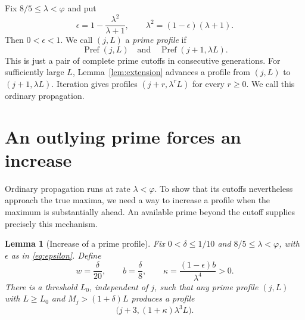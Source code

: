 \documentclass[11pt,letterpaper]{article}
\numberwithin{equation}{section}
\newtheorem{lemma}[theorem]{Lemma}
\theoremstyle{definition}
\theoremstyle{remark}
\DeclareMathOperator{\Pref}{Pref}
\newcommand{\ph}{\varphi}
\begin{document}
Fix $8/5\le\lambda<\ph$ and put
\begin{equation}\label{eq:epsilon}
 \epsilon=1-\frac{\lambda^2}{\lambda+1},
 \qquad \lambda^2=(1-\epsilon)(\lambda+1).
\end{equation}
Then $0<\epsilon<1$. We call $(j,L)$ a \emph{prime profile} if
\begin{equation}\label{eq:profile}
 \Pref(j,L)\quad\text{and}\quad\Pref(j+1,\lambda L).
\end{equation}
This is just a pair of complete prime cutoffs in consecutive generations.
For sufficiently large $L$, Lemma~\ref{lem:extension} advances a profile
from $(j,L)$ to $(j+1,\lambda L)$. Iteration gives profiles
$(j+r,\lambda^rL)$ for every $r\ge0$. We call this ordinary propagation.

\section{An outlying prime forces an increase}
\label{sec:boost}

Ordinary propagation runs at rate $\lambda<\ph$. To show that its cutoffs
nevertheless approach the true maxima, we need a way to increase a profile
when the maximum is substantially ahead. An available prime beyond the
cutoff supplies precisely this mechanism.

\begin{lemma}[Increase of a prime profile]\label{lem:boost}
Fix $0<\delta\le1/10$ and $8/5\le\lambda<\ph$, with $\epsilon$ as in
\eqref{eq:epsilon}. Define
\begin{equation}\label{eq:boost-parameters}
 w=\frac\delta{20},\qquad b=\frac\delta8,\qquad
 \kappa=\frac{(1-\epsilon)b}{\lambda^4}>0.
\end{equation}
There is a threshold $L_0$, independent of $j$, such that any prime profile
$(j,L)$ with $L\ge L_0$ and $M_j>(1+\delta)L$ produces a profile
\begin{equation}\label{eq:boosted-profile}
 \bigl(j+3,(1+\kappa)\lambda^3L\bigr).
\end{equation}
\end{lemma}
\end{document}
